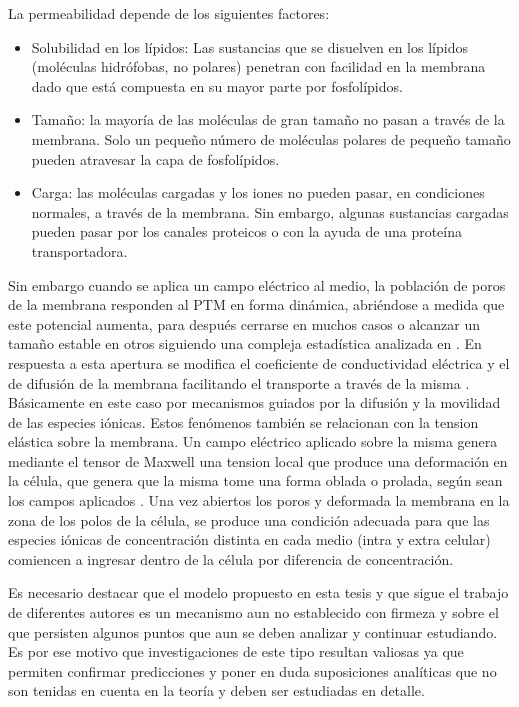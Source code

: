 La permeabilidad depende de los siguientes factores:
\begin{itemize}
    \item Solubilidad en los lípidos: Las sustancias que se disuelven en los lípidos (moléculas hidrófobas, no polares) penetran con facilidad en la membrana dado que está compuesta en su mayor parte por fosfolípidos.
    \item Tamaño: la mayoría de las moléculas de gran tamaño no pasan a través de la membrana. Solo un pequeño número de moléculas polares de pequeño tamaño pueden atravesar la capa de fosfolípidos.
    \item Carga: las moléculas cargadas y los iones no pueden pasar, en condiciones normales, a través de la membrana. Sin embargo, algunas sustancias cargadas pueden pasar por los canales proteicos o con la ayuda de una proteína transportadora.
\end{itemize}
Sin embargo cuando se aplica un campo eléctrico al medio, la población de poros de la membrana responden al PTM en forma dinámica, abriéndose a medida que este potencial aumenta, para después cerrarse en muchos casos o alcanzar un tamaño estable en otros siguiendo una compleja estadística analizada en \cite{krass07}. En respuesta a esta apertura se modifica el coeficiente de conductividad eléctrica y el de difusión de la membrana facilitando el transporte a través de la misma \cite{c6-fodava}. Básicamente en este caso por mecanismos guiados por la difusión y la movilidad de las especies iónicas. Estos fenómenos también se relacionan con la tension elástica sobre la membrana. Un campo eléctrico aplicado sobre la misma genera mediante el tensor de Maxwell una tension local que produce una deformación en la célula, que genera que la misma tome una forma oblada o prolada, según sean los campos aplicados \cite{c13, c14}. Una vez abiertos los poros y deformada la membrana en la zona de los polos de la célula, se produce una condición adecuada para que las especies iónicas de concentración distinta en cada medio (intra y extra celular) comiencen a ingresar dentro de la célula por diferencia de concentración. 

Es necesario destacar que el modelo propuesto en esta tesis y que sigue el trabajo de diferentes autores \cite{krass07, c8}  es un mecanismo aun no establecido con firmeza y sobre el que persisten algunos puntos que aun se deben analizar y continuar estudiando. Es por ese motivo que investigaciones de este tipo resultan valiosas ya que permiten confirmar predicciones y poner en duda suposiciones analíticas que no son tenidas en cuenta en la teoría y deben ser estudiadas en detalle. 

